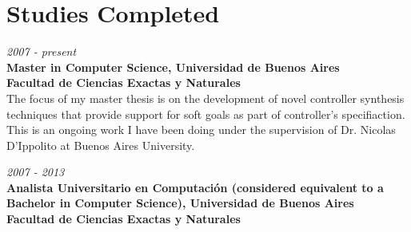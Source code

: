 \section{Studies Completed}

\begin{large}
    \textit{2007 - present}\\
	   \textbf{Master in Computer Science, Universidad de Buenos Aires}\\
      \textbf{Facultad de Ciencias Exactas y Naturales}\\
	  The focus of my master thesis is on the development of novel controller synthesis techniques that provide support for soft goals as part of controller's specifiaction. This is an ongoing work I have been doing under the supervision of Dr. Nicolas D'Ippolito at Buenos Aires University.\\
\end{large}

\begin{large}
\noindent    \textit{2007 - 2013}\\
	   \textbf{Analista Universitario en Computación (considered equivalent to a Bachelor in Computer Science), Universidad de Buenos Aires}\\
      \textbf{Facultad de Ciencias Exactas y Naturales}\\
\end{large}

